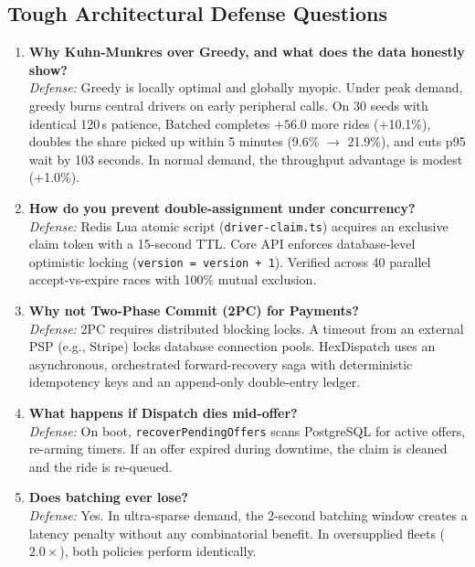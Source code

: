 \documentclass[11pt,a4paper]{article}
\begin{document}
\subsection{Tough Architectural Defense Questions}
\begin{enumerate}[leftmargin=1.5em]
    \item \textbf{Why Kuhn-Munkres over Greedy, and what does the data honestly show?} \\
    \textit{Defense:} Greedy is locally optimal and globally myopic. Under peak demand, greedy burns central drivers on early peripheral calls. On 30 seeds with identical 120\,s patience, Batched completes $+56.0$ more rides (+10.1\%), doubles the share picked up within 5 minutes (9.6\% $\to$ 21.9\%), and cuts p95 wait by 103 seconds. In normal demand, the throughput advantage is modest (+1.0\%).
    \item \textbf{How do you prevent double-assignment under concurrency?} \\
    \textit{Defense:} Redis Lua atomic script (\texttt{driver-claim.ts}) acquires an exclusive claim token with a 15-second TTL. Core API enforces database-level optimistic locking (\texttt{version = version + 1}). Verified across 40 parallel accept-vs-expire races with 100\% mutual exclusion.
    \item \textbf{Why not Two-Phase Commit (2PC) for Payments?} \\
    \textit{Defense:} 2PC requires distributed blocking locks. A timeout from an external PSP (e.g., Stripe) locks database connection pools. HexDispatch uses an asynchronous, orchestrated forward-recovery saga with deterministic idempotency keys and an append-only double-entry ledger.
    \item \textbf{What happens if Dispatch dies mid-offer?} \\
    \textit{Defense:} On boot, \texttt{recoverPendingOffers} scans PostgreSQL for active offers, re-arming timers. If an offer expired during downtime, the claim is cleaned and the ride is re-queued.
    \item \textbf{Does batching ever lose?} \\
    \textit{Defense:} Yes. In ultra-sparse demand, the 2-second batching window creates a latency penalty without any combinatorial benefit. In oversupplied fleets ($2.0\times$), both policies perform identically.
\end{enumerate}
\end{document}
